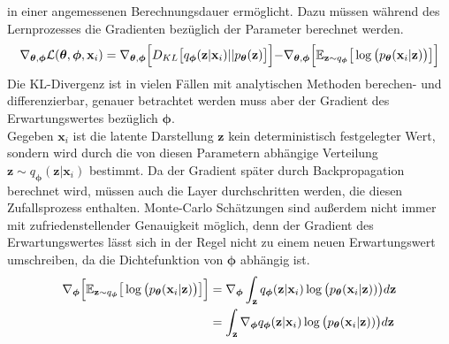 \documentclass[12pt]{article}
\newcommand{\qenc}{q_{\boldsymbol\phi}(\mathbf{z}|\mathbf{x}_i)}
\newcommand{\pdec}{p_{\boldsymbol\theta}(\mathbf{x}_i|\mathbf{z})}
\newcommand{\z}{\mathbf{z}}
\newcommand{\x}{\mathbf{x}_i}
\begin{document}
	in einer angemessenen Berechnungsdauer ermöglicht. Dazu müssen während des Lernprozesses die Gradienten bezüglich der Parameter berechnet werden.
	\begin{align*}
	\nabla_{\boldsymbol\theta,\boldsymbol\phi} \mathcal{L}(\boldsymbol\theta,\boldsymbol\phi,\x) = \nabla_{\boldsymbol\theta,\boldsymbol\phi} \Bigl[D_{KL}\big[\qenc || p_{\boldsymbol\theta}(\textbf{z})\big]\Bigl]- \nabla_{\boldsymbol\theta,\boldsymbol\phi}\Bigl[\mathbb{E}_{\z\sim q_{\boldsymbol\phi}}\big[\log\big(\pdec\big)\big]\Bigl]
	\end{align*}
	Die KL-Divergenz ist in vielen Fällen mit analytischen Methoden berechen- und differenzierbar, genauer betrachtet werden muss aber der Gradient des Erwartungswertes bezüglich $\boldsymbol\phi$. \\
	Gegeben $\textbf{x}_{i}$ ist die latente Darstellung $\z$ kein deterministisch festgelegter Wert, sondern wird durch die von diesen Parametern abhängige Verteilung $\z \sim \qenc$ bestimmt. Da der Gradient später durch Backpropagation berechnet wird, müssen auch die Layer durchschritten werden, die diesen Zufallsprozess enthalten. Monte-Carlo Schätzungen sind außerdem nicht immer mit zufriedenstellender Genauigkeit möglich, denn der Gradient des Erwartungswertes lässt sich in der Regel nicht zu einem neuen Erwartungswert umschreiben, da die Dichtefunktion von $\boldsymbol\phi$ abhängig ist.
	\begin{align*}
	\nabla_{\boldsymbol\phi}\Bigl[\mathbb{E}_{\z\sim q_{\boldsymbol\phi}}\big[\log\big(\pdec\big)\big]\Bigl] &= \nabla_{\boldsymbol\phi} \int_{\textbf{z}}\qenc\log\big(\pdec)\big)d\textbf{z} \notag \\
	&= \int_{\textbf{z}}\nabla_{\boldsymbol\phi}\qenc\log\big(\pdec)\big)d\textbf{z}
	\end{align*}
\end{document}
